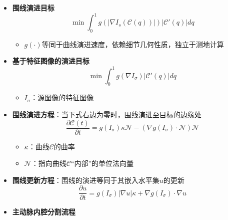 \begin{frame}
\begin{itemize}
 \item \textbf{围线演进目标}
\begin{equation*}
\min \int_0^1 g(|\nabla I_{s} ( \mathcal{C} (q) )|) |\mathcal{C}' (q)| dq
\end{equation*}
\begin{itemize}
\item $g(\cdot)$等同于曲线演进速度，依赖细节几何性质，独立于测地计算
\end{itemize}
 \item \textbf{基于特征图像的演进目标}
\begin{equation*}
\min \int_0^1 g(\nabla I_{\sigma}) |\mathcal{C}' (q)| dq
\end{equation*}
\begin{itemize}
\item $I_{\sigma}$：源图像的特征图像
\end{itemize}
\end{itemize}
\end{frame}

\begin{frame}
\begin{itemize}
 \item \textbf{围线演进方程}：当下式右边为零时，围线演进至目标的边缘处
\begin{equation*}
\label{eqn:EvolutionModel}
\frac{\partial \mathcal{C}(t)}{\partial t} = g(I_{\sigma}) \kappa \mathcal{N} - (\nabla g(I_{\sigma}) \cdot \mathcal{N}) \mathcal{N}
\end{equation*}
\begin{itemize}
\item $\kappa$：曲线$\mathcal{C}$的曲率
\item $\mathcal{N}$：指向曲线$\mathcal{C}$“内部”的单位法向量
\end{itemize}
 \item \textbf{围线更新方程}：围线的演进等同于其嵌入水平集$u$的更新
\begin{equation*}
\frac{\partial u}{\partial t} = g(I_{\sigma}) |\nabla u| \kappa + \nabla g(I_{\sigma}) \cdot \nabla u
\end{equation*}
\end{itemize}
\end{frame}

\begin{frame}
\begin{itemize}
\item \textbf{主动脉内腔分割流程}
\end{itemize}
\begin{figure}[t]
\centering

\end{figure}
\end{frame}

